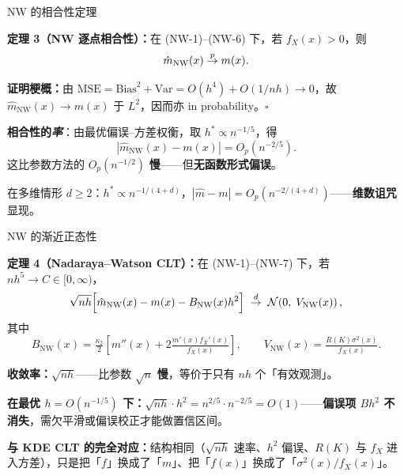 \documentclass[aspectratio=169, 10pt]{beamer}
\begin{document}
\begin{frame}{NW 的相合性定理}

  \begin{highlightbox}
    \textbf{定理 3（NW 逐点相合性）：}在 (NW-1)--(NW-6) 下，若 $f_X(x)>0$，则
    \[
      \hat m_{\text{NW}}(x) \overset{p}{\to} m(x).
    \]
  \end{highlightbox}

  \vspace{0.3em}

  \hypertarget{main-b8}{}\textbf{证明梗概：}由 $\text{MSE} = \text{Bias}^2 + \text{Var} = O(h^4) + O(1/nh) \to 0$，故 $\hat m_{\text{NW}}(x) \to m(x)$ 于 $L^2$，因而亦 in probability。\quad$\square$\ \hfill{\scriptsize\hyperlink{proof-b8}{}}


  \begin{keybox}
    \textbf{相合性的\emph{率}}：由最优偏误--方差权衡，取 $h^* \propto n^{-1/5}$，得
    \[
      |\hat m_{\text{NW}}(x) - m(x)| = O_p(n^{-2/5}).
    \]
    这比参数方法的 $O_p(n^{-1/2})$ \textbf{慢}——但\textbf{无函数形式偏误}。

    \vspace{0.3em}
    在多维情形 $d\geq 2$：$h^* \propto n^{-1/(4+d)}$，$|\hat m - m| = O_p(n^{-2/(4+d)})$——\textbf{维数诅咒}显现。
  \end{keybox}

\end{frame}


\begin{frame}{NW 的渐近正态性}

  \begin{highlightbox}
    \textbf{定理 4（Nadaraya--Watson CLT）：}在 (NW-1)--(NW-7) 下，若 $nh^5 \to C\in[0,\infty)$，
    \[
      \sqrt{nh}\Bigl[\hat m_{\text{NW}}(x) - m(x) - B_{\text{NW}}(x) h^2\Bigr]
      \;\overset{d}{\to}\; \mathcal{N}\!\left(0,\; V_{\text{NW}}(x)\right),
    \]
    其中
    \[
      B_{\text{NW}}(x) = \tfrac{\kappa_2}{2}\left[m''(x) + 2\tfrac{m'(x) f_X'(x)}{f_X(x)}\right],\qquad
      V_{\text{NW}}(x) = \tfrac{R(K)\sigma^2(x)}{f_X(x)}.
    \]
  \end{highlightbox}

  \vspace{0.3em}

  \textbf{收敛率：}$\sqrt{nh}$——比参数 $\sqrt{n}$ \textbf{慢}，等价于只有 $nh$ 个「有效观测」。

  \textbf{在最优 $h = O(n^{-1/5})$ 下：}$\sqrt{nh}\cdot h^2 = n^{2/5}\cdot n^{-2/5} = O(1)$——\textbf{偏误项 $B h^2$ 不消失}，需欠平滑或偏误校正才能做置信区间。

  \begin{keybox}
    \textbf{与 KDE CLT 的完全对应：}结构相同（$\sqrt{nh}$ 速率、$h^2$ 偏误、$R(K)$ 与 $f_X$ 进入方差），只是把「$f$」换成了「$m$」、把「$f(x)$」换成了「$\sigma^2(x)/f_X(x)$」。
  \end{keybox}
  \hypertarget{main-b5}{}\hfill{\scriptsize\hyperlink{proof-b5}{}}

\end{frame}
\end{document}
